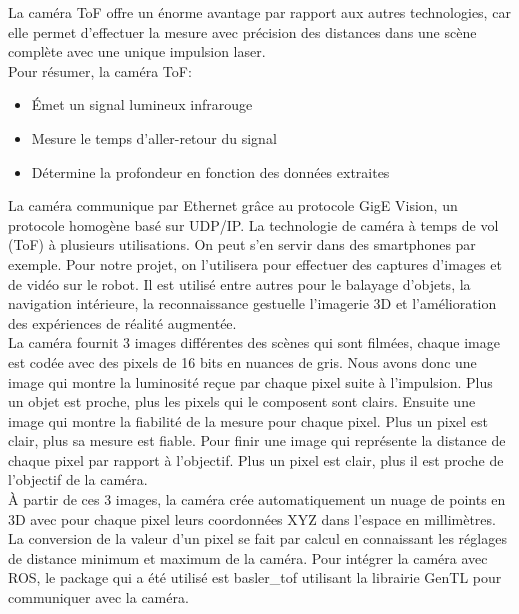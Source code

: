 La caméra ToF offre un énorme avantage par rapport aux autres technologies, car elle permet d'effectuer la  mesure avec précision des distances dans une scène complète avec une unique impulsion laser.\\

Pour résumer, la caméra ToF:
\begin{itemize}
    \item Émet un signal lumineux infrarouge
    \item Mesure le temps d'aller-retour du signal
    \item Détermine la profondeur en fonction des données extraites\\
\end{itemize}

La caméra communique par Ethernet grâce au protocole GigE Vision, un protocole homogène basé sur UDP/IP.
La technologie de caméra à temps de vol (ToF) à plusieurs utilisations. On peut s'en servir dans des smartphones par exemple. Pour notre projet, on l'utilisera pour effectuer des captures d'images et de vidéo sur le robot. Il est utilisé entre autres pour le balayage d'objets, la navigation intérieure, la reconnaissance gestuelle l'imagerie 3D et l'amélioration des expériences de réalité augmentée.\\

La caméra fournit 3 images différentes des scènes qui sont filmées, chaque image est codée avec des pixels de 16 bits en nuances de gris.
Nous avons donc une image qui montre la luminosité reçue par chaque pixel suite à l’impulsion. Plus un objet est proche, plus les pixels qui le composent sont clairs.
Ensuite une image qui montre la fiabilité de la mesure pour chaque pixel. Plus un pixel est clair, plus sa mesure est fiable.
Pour finir une image qui représente la distance de chaque pixel par rapport à l’objectif. Plus un pixel est clair, plus il est proche de l'objectif de la caméra.\\
À partir de ces 3 images, la caméra crée automatiquement un nuage de points en 3D avec pour chaque pixel leurs coordonnées XYZ dans l’espace en millimètres.
La conversion de la valeur d’un pixel  se fait par calcul en connaissant les réglages de distance minimum et maximum de la caméra.
Pour intégrer la caméra avec ROS, le package qui a été utilisé est basler\_tof utilisant la librairie GenTL pour communiquer avec la caméra.\\


